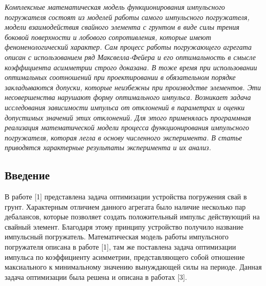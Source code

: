
\vzmscaption

\textit{Комплексные математическая модель функционирования импульсного погружателя состоят из моделей работы самого импульсного погружателя, модели взаимодействия свайного элемента с грунтом в виде силы трения боковой поверхности и лобового сопротивления,
которые имеют феноменологический характер. Сам процесс работы погружающего агрегата описан с использованием ряд Максвелла-Фейера и его оптимальность в смысле коэффициента асимметрии строго доказана.
В тоже время при использовании оптимальных соотношений при проектировании в обязательном порядке закладываются допуски, которые неизбежны при производстве элементов. Эти несовершенства нарушают форму оптимального импульса.\linebreak
Возникает задача исследования зависимости импульса от отклонений в параметрах и оценки допустимых значений этих отклонений. Для этого применялась программная реализация математической модели процесса функционирования импульсного погружателя,
которая легла в основу численного эксперимента. В статье приводятся характерные результаты эксперимента и их анализ.}


\subsection{Введение}

В работе [1] представлена задача оптимизации устройства погружения свай в грунт. Характерным отличием данного агрегата было наличие несколько пар дебалансов, которые позволяет создать положительный импульс действующий на свайный элемент.
Благодаря этому принципу устройство получило название импульсный погружатель. Математическая модель работы импульсного погружателя описана в работе [1], там же поставлена задача оптимизации импульса по коэффициенту асимметрии,
представляющего собой отношение максиального к минимальному значению вынуждающей силы на периоде. Данная задача оптимизации была решена и описана в работах [3].

